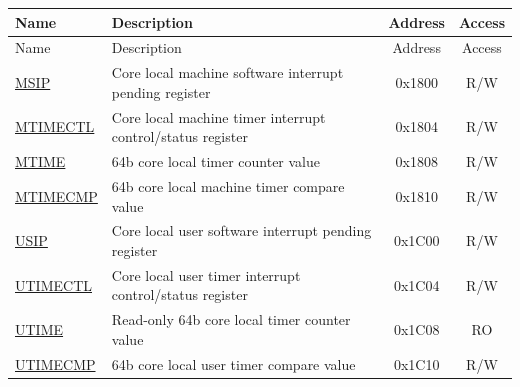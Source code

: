 
\begin{longtable}{ | p{4.0cm} | p{8.4cm} | c | c| }
\hline\rowcolor{lightgray}
Name & Description & Address & Access \\ \hline
\endfirsthead
\hline
\rowcolor{lightgray}
Name & Description & Address & Access  \\
\hline
\endhead
\endfoot

\hyperref[regdesc:CLINTMSIPREG] {MSIP} & Core local machine software interrupt pending register & 0x1800 & R/W \\\hline
\hyperref[regdesc:CLINTMTIMECTLREG] {MTIMECTL} & Core local machine timer interrupt control/status register & 0x1804 & R/W \\\hline
\hyperref[regdesc:CLINTMTIMEREG] {MTIME} & 64b core local timer counter value & 0x1808 & R/W \\\hline
\hyperref[regdesc:CLINTMTIMECMPREG] {MTIMECMP} & 64b core local machine timer compare value & 0x1810 & R/W \\\hline
\hyperref[regdesc:CLINTUSIPREG] {USIP} & Core local user software interrupt pending register & 0x1C00 & R/W \\\hline
\hyperref[regdesc:CLINTUTIMECTLREG] {UTIMECTL} & Core local user timer interrupt control/status register & 0x1C04 & R/W \\\hline
\hyperref[regdesc:CLINTUTIMEREG] {UTIME} & Read-only 64b core local timer counter value & 0x1C08 & RO \\\hline
\hyperref[regdesc:CLINTUTIMECMPREG] {UTIMECMP} & 64b core local user timer compare value & 0x1C10 & R/W \\\hline
\end{longtable}
